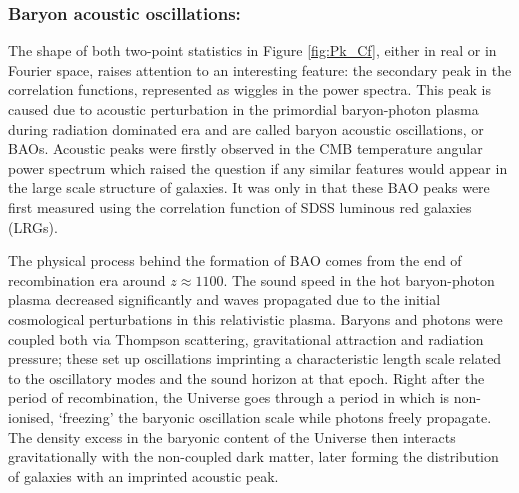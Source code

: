 \subsubsection{Baryon acoustic oscillations:}
The shape of both two-point statistics in Figure \ref{fig:Pk_Cf}, either in real or in Fourier space, raises attention to an interesting feature: the secondary peak in the correlation functions, represented as wiggles in the power spectra. This peak is caused due to acoustic perturbation in the primordial baryon-photon plasma during radiation dominated era and are called baryon acoustic oscillations, or BAOs. Acoustic peaks were firstly observed in the CMB temperature angular power spectrum which raised the question if any similar features would appear in the large scale structure of galaxies. It was only in \cite{Einsenstein2005} that these BAO peaks were first measured using the correlation function of SDSS luminous red galaxies (LRGs).

\qquad The physical process behind the formation of BAO comes from the end of recombination era around $z \approx 1100$. The sound speed in the hot baryon-photon plasma decreased significantly and waves propagated due to the initial cosmological perturbations in this relativistic plasma. Baryons and photons were coupled both via Thompson scattering, gravitational attraction and radiation pressure; these set up oscillations imprinting a characteristic length scale related to the oscillatory modes and the sound horizon at that epoch. Right after the period of recombination, the Universe goes through a period in which is non-ionised, `freezing' the baryonic oscillation scale while photons freely propagate. The density excess in the baryonic content of the Universe then interacts gravitationally with the non-coupled dark matter, later forming the distribution of galaxies with an imprinted acoustic peak.

